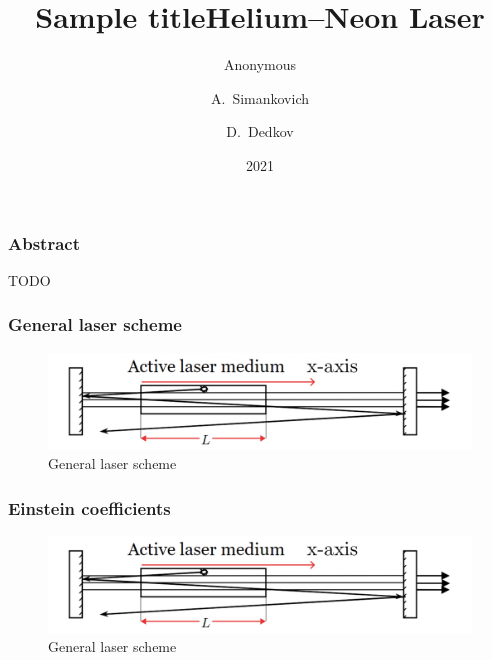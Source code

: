 \documentclass{beamer}
\title{Sample title}
\author{Anonymous}
\institute{Overleaf}
\date{2021}
\title[About Beamer] %
{Helium–Neon Laser}
\author[Arthur, Doe] %
{A.~Simankovich \and D.~Dedkov }
\institute[VFU] %
{
	Moscow Institute of Physics and Technology
}
\date[VLC 2023] %
\begin{document}
	
	\frame{\titlepage}
	
	\begin{frame}
		\frametitle{Abstract}
		TODO

	\end{frame}
	
	\begin{frame}
		\frametitle{General laser scheme}
		\begin{figure}
			\centering
			\includegraphics[width=1\linewidth]{res/general_laser_scheme.pdf}
			\caption{General laser scheme}
			\label{fig:general_laser_scheme}
		\end{figure}
		
	\end{frame}
	
	\begin{frame}
		\frametitle{Einstein coefficients}
		\begin{figure}
			\centering
			\includegraphics[width=1\linewidth]{res/general_laser_scheme.pdf}
			\caption{General laser scheme}
			\label{fig:general_laser_scheme}
		\end{figure}
		
	\end{frame}
	
\end{document}
